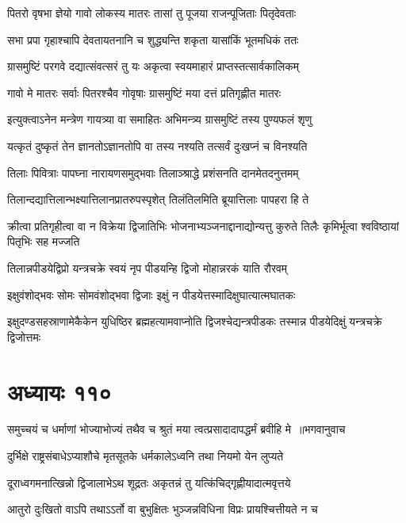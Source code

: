 \twolineshloka
{पितरो वृषभा ज्ञेयो गावो लोकस्य मातरः}
{तासां तु पूजया राजन्पूजिताः पितृदेवताः}


\twolineshloka
{सभा प्रपा गृहाश्चापि देवतायतनानि च}
{शुद्ध्यन्ति शकृता यासांकिं भूतमधिकं ततः}


\twolineshloka
{ग्रासमुष्टिं परगवे दद्यात्संवत्सरं तु यः}
{अकृत्वा स्वयमाहारं प्राप्तस्तत्सार्वकालिकम्}


\twolineshloka
{गावो मे मातरः सर्वाः पितरश्चैव गोवृषाः}
{ग्रासमुष्टिं मया दत्तं प्रतिगृह्णीत मातरः}


\twolineshloka
{इत्युक्त्वाऽनेन मन्त्रेण गायत्र्या वा समाहितः}
{अभिमन्त्र्य ग्रासमुष्टिं तस्य पुण्यफलं शृणु}


\twolineshloka
{यत्कृतं दुष्कृतं तेन ज्ञानतोऽज्ञानतोपि वा}
{तस्य नश्यति तत्सर्वं दुःखप्नं च विनश्यति}


\twolineshloka
{तिलाः पिवित्राः पापघ्ना नारायणसमुद्भवाः}
{तिलाञ्श्राद्धे प्रशंसनति दानमेतदनुत्तमम्}


\twolineshloka
{तिलान्दद्यात्तिलान्भक्ष्यात्तिलानप्रातरुपस्पृशेत्}
{तिलंतिलमिति ब्रूयात्तिलाः पापहरा हि ते}


\threelineshloka
{क्रीत्वा प्रतिगृहीत्वा वा न विक्रेया द्विजातिभिः}
{भोजनाभ्यञ्जनाद्दानाद्योन्यत्तु कुरुते तिलैः}
{कृमिर्भूत्वा श्वविष्ठायां पितृभिः सह मज्जति}


\twolineshloka
{तिलान्नपीडयेद्विप्रो यन्त्रचक्रे स्वयं नृप}
{पीडयन्हि द्विजो मोहान्नरकं याति रौरवम्}


\twolineshloka
{इक्षुवंशोद्भवः सोमः सोमवंशोद्भवा द्विजाः}
{इक्षुं न पीडयेत्तस्मादिक्षुघात्यात्मघातकः}


\threelineshloka
{इक्षुदण्डसहस्राणामेकैकेन युधिष्ठिर}
{ब्रह्महत्यामवाप्नोति द्विजश्चेद्यन्त्रपीडकः}
{तस्मान्न पीडयेदिक्षुं यन्त्रचक्रे द्विजोत्तमः}


\chapter{अध्यायः ११०}
\threelineshloka
{समुच्चयं च धर्माणां भोज्याभोज्यं तथैव च}
{श्रुतं मया त्वत्प्रसादादापद्धर्मं ब्रवीहि मे ॥भगवानुवाच}
{}


\twolineshloka
{दुर्भिक्षे राष्ट्रसंबाधेऽप्याशौचे मृतसूतके}
{धर्मकालेऽध्वनि तथा नियमो येन लुप्यते}


\twolineshloka
{दूराध्वगमनात्खिन्नो द्विजालाभेऽथ शूद्रतः}
{अकृतन्नं तु यत्किंचिद्गृह्णीयादात्मवृत्तये}


\twolineshloka
{आतुरो दुःखितो वाऽपि तथाऽऽर्तो वा बुभुक्षितः}
{भुञ्जन्नविधिना विप्रः प्रायश्चित्तीयते न च}


